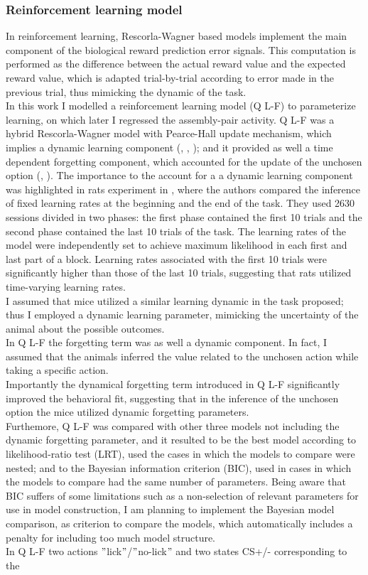 \subsubsection{Reinforcement learning model}
In reinforcement learning, Rescorla-Wagner based models implement the main component of the biological reward prediction error signals. This computation is performed as the difference between the actual reward value and the expected reward value, which is adapted trial-by-trial according to error made in the previous trial, thus mimicking the dynamic of the task.\\In this work I modelled a reinforcement learning model (Q L-F) to parameterize learning, on which later I regressed the assembly-pair activity. Q L-F was a hybrid Rescorla-Wagner model with Pearce-Hall update mechanism, which implies a dynamic learning component (\cite{Koppe}, \cite{Li}, \cite{Costa}); and it provided as well a time dependent forgetting component, which accounted for the update of the unchosen option (\cite{ItoDoya1}, \cite{Katahira}). The importance to the account for a a dynamic learning component was highlighted in rats experiment in , where the authors compared the inference of fixed learning rates at the beginning and the end of the task. They used 2630 sessions divided in two phases: the first phase contained the first 10 trials and the second phase contained the last 10 trials of the task. The learning rates of the model were independently set to achieve maximum likelihood in each first and last part of a block. Learning rates associated with the first 10 trials were significantly higher than those of the last 10 trials, suggesting that rats utilized time-varying learning rates.\\I assumed that mice utilized a similar learning dynamic in the task proposed; thus I employed a dynamic learning parameter, mimicking the uncertainty of the animal about the possible outcomes.\\In Q L-F the forgetting term was as well a dynamic component. In fact, I assumed that the animals inferred the value related to the unchosen action while taking a specific action.\\Importantly the dynamical forgetting term introduced in Q L-F significantly improved the behavioral fit, suggesting that in the inference of the unchosen option the mice utilized dynamic forgetting parameters.\\Furthemore, Q L-F was compared with other three models not including the dynamic forgetting parameter, and it resulted to be the best model according to likelihood-ratio test (LRT), used the cases in which the models to compare were nested; and to the Bayesian information criterion (BIC), used in cases in which the models to compare had the same number of parameters. Being aware that BIC suffers of some limitations such as a non-selection of relevant parameters for use in model construction, I am planning to implement the Bayesian model comparison, as criterion to compare the models, which automatically includes a penalty for including too much model structure.\\In Q L-F two actions $"$lick$"$/$"$no-lick$"$ and two states CS+/- corresponding to the 